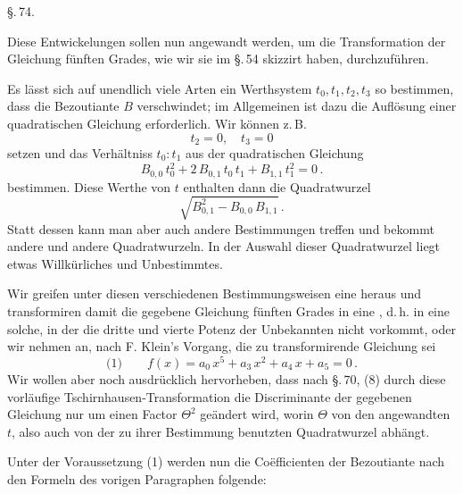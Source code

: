 

\begin{center}
\S.\,74.

\end{center}

\indent Diese Entwickelungen sollen nun angewandt werden, um
die Transformation der Gleichung fünften Grades, wie wir sie
im \S.\,54 skizzirt haben, durchzuführen.

\indent Es lässt sich auf unendlich viele Arten ein Werthsystem
$t_0, t_1, t_2, t_3$ so bestimmen, dass die Bezoutiante $B$ verschwindet;
im Allgemeinen ist dazu die Auflösung einer quadratischen
Gleichung erforderlich. Wir können z.\,B.
\[
t_2 = 0, \quad t_3 = 0
\]
setzen und das Verhältniss $t_0 : t_1$ aus der quadratischen Gleichung
\[
B_{0,0}\,t_0^2 + 2\,B_{0,1}\,t_0\,t_1 + B_{1,1}\,t_1^2 = 0\,.
\]
bestimmen. Diese Werthe von $t$ enthalten dann die Quadratwurzel
\[
\sqrt{B_{0,1}^2 - B_{0,0}\,B_{1,1}}\,.
\]
Statt dessen kann man aber auch andere Bestimmungen treffen
und bekommt andere und andere Quadratwurzeln. In der Auswahl
dieser Quadratwurzel liegt etwas Willkürliches und Unbestimmtes.

\indent Wir greifen unter diesen verschiedenen Bestimmungsweisen
eine heraus und transformiren damit die gegebene Gleichung
fünften Grades in eine , d.\,h. in eine solche,
in der die dritte und vierte Potenz der Unbekannten nicht vorkommt, oder wir nehmen an, nach F. Klein's Vorgang, die zu
transformirende Gleichung sei 
\[
\text{(1)} \qquad f(x) = a_0\,x^5 + a_3\,x^2 + a_4\,x + a_5 = 0\,.
\]
Wir wollen aber noch ausdrücklich hervorheben, dass nach
\S.\,70, (8) durch diese vorläufige Tschirnhausen-Transformation
die Discriminante der gegebenen Gleichung nur um einen Factor
$\Theta^2$ geändert wird, worin $\Theta$  von den angewandten $t$,
also auch von der zu ihrer Bestimmung benutzten Quadratwurzel
abhängt.

\indent Unter der Voraussetzung (1) werden nun die Co\"efficienten
der Bezoutiante nach den Formeln des vorigen Paragraphen
folgende:
